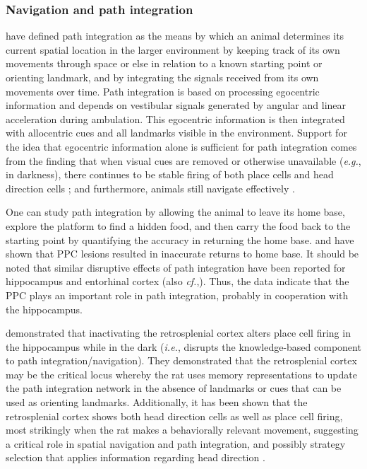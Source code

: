 \documentclass[doc, longtable]{apa6}
\begin{document}
\subsubsection{Navigation and path integration}
\textcite{Whishaw1997a} have defined path integration as the means by which an animal determines its current spatial location in the larger environment by keeping track of its own movements through space or else in relation to a known starting point or orienting landmark, and by integrating the signals received from its own movements over time. Path integration is based on processing egocentric information and depends on vestibular signals generated by angular and linear acceleration during ambulation. This egocentric information is then integrated with allocentric cues and all landmarks visible in the environment. Support for the idea that egocentric information alone is sufficient for path integration comes from the finding that when visual cues are removed or otherwise unavailable (\textit{e.g.}, in darkness), there continues to be stable firing of both place cells \parencite{Jeffery1997a, Quirk1990a} and head direction cells \parencite{Golob1999b}; and furthermore, animals still navigate effectively \parencite{Etienne2004a}. 
	
One can study path integration by allowing the animal to leave its home base, explore the platform to find a hidden food, and then carry the food back to the starting point by quantifying the accuracy in returning the home base. \textcite{Save2001a} and \textcite{Parron2004c} have shown that PPC lesions resulted in inaccurate returns to home base. It should be noted that similar disruptive effects of path integration have been reported for hippocampus and entorhinal cortex (also \textit{cf.},\cite{Whishaw1996b}). Thus, the data indicate that the PPC plays an important role in path integration, probably in cooperation with the hippocampus. 
	
\textcite{Cooper2001a} demonstrated that inactivating the retrosplenial cortex alters place cell firing in the hippocampus while in the dark (\textit{i.e.}, disrupts the knowledge-based component to path integration/navigation). They demonstrated that the retrosplenial cortex may be the critical locus whereby the rat uses memory representations to update the path integration network in the absence of landmarks or cues that can be used as orienting landmarks. Additionally, it has been shown that the retrosplenial cortex shows both head direction cells as well as place cell firing, most strikingly when the rat makes a behaviorally relevant movement, suggesting a critical role in spatial navigation and path integration, and possibly strategy selection that applies information regarding head direction \parencite{cho2001head}.
	
\end{document}
